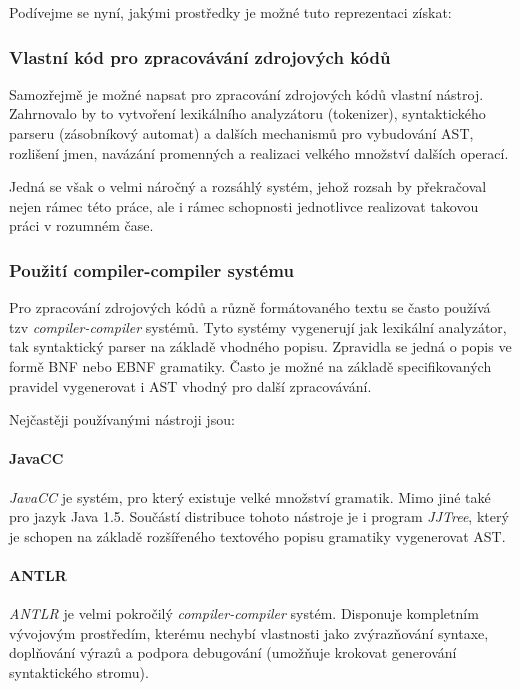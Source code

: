 Podívejme se nyní, jakými prostředky je možné tuto reprezentaci získat:

\subsubsection{Vlastní kód pro zpracovávání zdrojových kódů}
Samozřejmě je možné napsat pro zpracování zdrojových kódů vlastní nástroj. Zahrnovalo by to vytvoření lexikálního analyzátoru (tokenizer), syntaktického parseru (zásobníkový automat) a dalších mechanismů pro vybudování AST, rozlišení jmen, navázání promenných a realizaci velkého množství dalších operací.

Jedná se však o velmi náročný a rozsáhlý systém, jehož rozsah by překračoval nejen rámec této práce, ale i rámec schopnosti jednotlivce realizovat takovou práci v rozumném čase.

\subsubsection{Použití compiler-compiler systému}
Pro zpracování zdrojových kódů a různě formátovaného textu se často používá tzv \emph{compiler-compiler} systémů. Tyto systémy vygenerují jak lexikální analyzátor, tak syntaktický parser na základě vhodného popisu. Zpravidla se jedná o popis ve formě BNF nebo EBNF gramatiky. Často je možné na základě specifikovaných pravidel vygenerovat i AST vhodný pro další zpracovávání.

Nejčastěji používanými nástroji jsou:

\paragraph{JavaCC} \emph{JavaCC} \cite{parsertools:javacc} je systém, pro který existuje velké množství gramatik. Mimo jiné také pro jazyk Java 1.5. Součástí distribuce tohoto nástroje je i program \emph{JJTree}, který je schopen na základě rozšířeného textového popisu gramatiky vygenerovat AST.

\paragraph{ANTLR} \emph{ANTLR} \cite{parsertools:antlr} je velmi pokročilý \emph{compiler-compiler} systém. Disponuje kompletním vývojovým prostředím, kterému nechybí vlastnosti jako zvýrazňování syntaxe, doplňování výrazů a podpora debugování (umožňuje krokovat generování syntaktického stromu).

